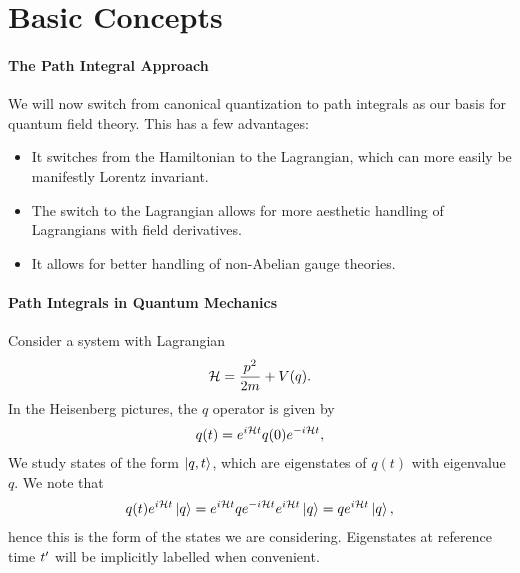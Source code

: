 \section{Basic Concepts}

\paragraph{The Path Integral Approach}
We will now switch from canonical quantization to path integrals as our basis for quantum field theory. This has a few advantages:
\begin{itemize}
	\item It switches from the Hamiltonian to the Lagrangian, which can more easily be manifestly Lorentz invariant.
	\item The switch to the Lagrangian allows for more aesthetic handling of Lagrangians with field derivatives.
	\item It allows for better handling of non-Abelian gauge theories.
\end{itemize}

\paragraph{Path Integrals in Quantum Mechanics}
Consider a system with Lagrangian
\begin{align*}
	\mathcal{H} = \frac{p^{2}}{2m} + V(q).
\end{align*}
In the Heisenberg pictures, the $q$ operator is given by
\begin{align*}
	q(t) = e^{i\mathcal{H} t}q(0)e^{-i\mathcal{H} t},
\end{align*}
We study states of the form $\ket{q, t}$, which are eigenstates of $q(t)$ with eigenvalue $q$. We note that
\begin{align*}
	q(t)e^{i\mathcal{H} t}\ket{q} = e^{i\mathcal{H} t}qe^{-i\mathcal{H} t}e^{i\mathcal{H} t}\ket{q} = qe^{i\mathcal{H} t}\ket{q},
\end{align*}
hence this is the form of the states we are considering. Eigenstates at reference time $t^{\prime}$ will be implicitly labelled when convenient.

